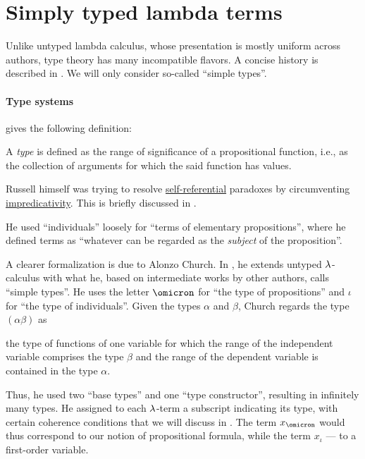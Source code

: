 \section{Simply typed lambda terms}\label{sec:simply_typed_lambda_terms}

Unlike untyped lambda calculus, whose presentation is mostly uniform across authors, type theory has many incompatible flavors. A concise history is described in . We will only consider so-called \enquote{simple types}.

\paragraph{Type systems}

\begin{remark}\label{rem:type_theory}
   gives the following definition:
  \begin{displayquote}
    A \textit{type} is defined as the range of significance of a propositional function, i.e., as the collection of arguments for which the said function has values.
  \end{displayquote}

  Russell himself was trying to resolve \hyperref[rem:self_reference]{self-referential} paradoxes by circumventing \hyperref[con:impredicativity]{impredicativity}. This is briefly discussed in .

  He used \enquote{individuals} loosely for \enquote{terms of elementary propositions}, where he defined terms as \enquote{whatever can be regarded as the \textit{subject} of the proposition}.

  A clearer formalization is due to Alonzo Church. In \cite{Church1940STT}, he extends untyped \( \mathrm{\lambda} \)-calculus with what he, based on intermediate works by other authors, calls \enquote{simple types}. He uses the letter \( \omicron \) for \enquote{the type of propositions} and \( \iota \) for \enquote{the type of individuals}. Given the types \( \alpha \) and \( \beta \), Church regards the type \( (\alpha\beta) \) as
  \begin{displayquote}
    \textellipsis the type of functions of one variable for which the range of the independent variable comprises the type \( \beta \) and the range of the dependent variable is contained in the type \( \alpha \).
  \end{displayquote}

  Thus, he used two \enquote{base types} and one \enquote{type constructor}, resulting in infinitely many types. He assigned to each \( \mathrm{\lambda} \)-term a subscript indicating its type, with certain coherence conditions that we will discuss in . The term \( x_\omicron \) would thus correspond to our notion of propositional formula, while the term \( x_\iota \) --- to a first-order variable.


\end{remark}

